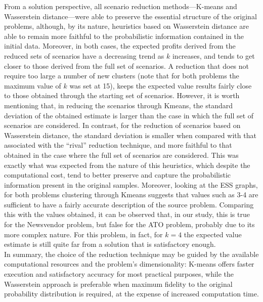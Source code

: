 \documentclass[a4paper,12pt]{article}
\begin{document}
	
\noindent	From a solution perspective, all scenario reduction methods—K-means and Wasserstein distance—were able to preserve the essential structure of the original problems, although, by its nature, heuristics based on Wasserstein distance are able to remain more faithful to the probabilistic information contained in the initial data. Moreover, in both cases, the expected profits derived from the reduced sets of scenarios have a decreasing trend as $k$ increases, and tends to get closer to those derived from the full set of scenarios. A reduction that does not require too large a number of new clusters (note that for both problems the maximum value of $k$ was set at 15), keeps the expected value results fairly close to those obtained through the starting set of scenarios. However, it is worth mentioning that, in reducing the scenarios through Kmeans, the standard deviation of the obtained estimate is larger than the case in which the full set of scenarios are considered. In contrast, for the reduction of scenarios based on Wasserstein distance, the standard deviation is smaller when compared with that associated with the “rival” reduction technique, and more faithful to that obtained in the case where the full set of scenarios are considered. This was exactly what was expected from the nature of this heuristics, which despite the computational cost, tend to better preserve and capture the probabilistic information present in the original samples. Moreover, looking at the ESS graphs, for both problems clustering through Kmeans suggests that values such as 3-4 are sufficient to have a fairly accurate description of the source problem. Comparing this with the values obtained, it can be observed that, in our study, this is true for the Newsvendor problem, but false for the ATO problem, probably due to its more complex nature. For this problem, in fact, for $k = 4$ the expected value estimate is still quite far from a solution that is satisfactory enough.\\
	
	\noindent In summary, the choice of the reduction technique may be guided by the available computational resources and the problem's dimensionality: K-means offers faster execution and satisfactory accuracy for most practical purposes, while the Wasserstein approach is preferable when maximum fidelity to the original probability distribution is required, at the expense of increased computation time.
	
\end{document}
